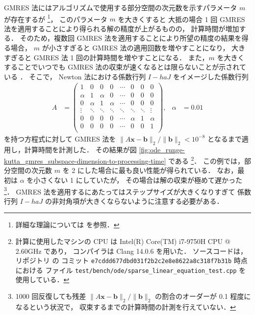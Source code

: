 GMRES 法にはアルゴリズムで使用する部分空間の次元数を示すパラメータ $m$ が存在するが
\footnote{詳細な理論については \cite[Section 11.4.3]{Golub2013} を参照．}，
このパラメータ $m$ を大きくすると
大抵の場合 1 回 GMRES 法を適用することにより得られる解の精度が上がるものの，
計算時間が増加する．
そのため，複数回 GMRES 法を適用することにより所望の精度の結果を得る場合，
$m$ が小さすぎると GMRES 法の適用回数を増やすことになり，
大きすぎると GMRES 法 1 回の計算時間を増やすことになる．
また，$m$ を大きくすることでいつでも GMRES 法の収束が速くなるとは限らないことが示されている
\cite{Blom2013}．
そこで，
Newton 法における係数行列 $I - h a J$ をイメージした係数行列
\begin{align}
    A      & =
    \begin{pmatrix}
        1      & 0      & 0      & 0      & \cdots & 0      & 0      & 0      \\
        \alpha & 1      & \alpha & 0      & \cdots & 0      & 0      & 0      \\
        0      & \alpha & 1      & \alpha & \cdots & 0      & 0      & 0      \\
        \vdots & \ddots & \ddots & \ddots & \ddots & \ddots & \ddots & \vdots \\
        0      & 0      & 0      & 0      & \cdots & \alpha & 1      & \alpha \\
        0      & 0      & 0      & 0      & \cdots & 0      & 0      & 1      \\
    \end{pmatrix}
    ,      &
    \alpha & = 0.01
\end{align}
を持つ方程式に対して GMRES 法を
$\|A\bm{x} - \bm{b}\|_2 / \|\bm{b}\|_2 < 10^{-8}$
となるまで適用し，計算時間を計測した．
その結果が図 \ref{fig:ode_runge-kutta_gmres_subspace-dimension-to-processing-time} である
\footnote{計算に使用したマシンの CPU は Intel(R) Core(TM) i7-9750H CPU @ 2.60GHz であり，%
    コンパイラは Clang 14.0.6 を用いた．%
    ソースコードは，リポジトリ \cite{NumericalCollectionCpp} の%
    コミット \texttt{e7cddd677dbd031f2b2c2e8e8622a8c318f7b31b} 時点における%
    ファイル \texttt{test/bench/ode/sparse\_linear\_equation\_test.cpp} を使用している．}．
この例では，部分空間の次元数 $m$ を 2 にした場合に最も良い性能が得られている．
なお，最初は $\alpha$ を小さくない 1 にしていたが，
その場合は解の収束が極めて遅かった
\footnote{1000 回反復しても残差 $\|A\bm{x} - \bm{b}\|_2 / \|\bm{b}\|_2$ の割合のオーダーが%
    0.1 程度になるという状況で，%
    収束するまでの計算時間の計測を行えていない．}．
GMRES 法を適用するにあたってはステップサイズが大きくなりすぎて
係数行列 $I - h a J$ の非対角項が大きくならないように注意する必要がある．

